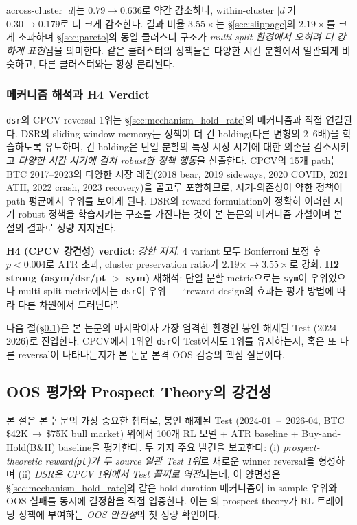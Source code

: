 \documentclass[11pt, a4paper]{article}
\begin{document}
across-cluster $|d|$는 $0.79 \to 0.636$로 약간 감소하나, within-cluster $|d|$가
$0.30 \to 0.179$로 더 크게 감소한다. 결과 비율 $3.55\times$는 \S\ref{sec:slippage}의
$2.19\times$를 크게 초과하며 \S\ref{sec:pareto}의 동일 클러스터 구조가
\emph{multi-split 환경에서 오히려 더 강하게 표현}됨을 의미한다. 같은 클러스터의
정책들은 다양한 시간 분할에서 일관되게 비슷하고, 다른 클러스터와는 항상 분리된다.

\subsubsection{메커니즘 해석과 H4 Verdict}
\label{sec:cpcv_mechanism}

\texttt{dsr}의 CPCV reversal 1위는 \S\ref{sec:mechanism_hold_rate}의 메커니즘과
직접 연결된다. DSR의 sliding-window memory는 정책이 더 긴 holding(다른 변형의
2--6배)을 학습하도록 유도하며, 긴 holding은 단일 분할의 특정 시장 시기에 대한
의존을 감소시키고 \emph{다양한 시간 시기에 걸쳐 robust한 정책 행동}을
산출한다. CPCV의 15개 path는 BTC 2017--2023의 다양한 시장 레짐(2018 bear,
2019 sideways, 2020 COVID, 2021 ATH, 2022 crash, 2023 recovery)을 골고루
포함하므로, 시기-의존성이 약한 정책이 path 평균에서 우위를 보이게 된다.
DSR의 reward formulation이 정확히 이러한 시기-robust 정책을 학습시키는 구조를
가진다는 것이 본 논문의 메커니즘 가설이며 본 절의 결과로 정량 지지된다.

\textbf{H4 (CPCV 강건성) verdict}: \emph{강한 지지}. 4 variant 모두 Bonferroni
보정 후 $p < 0.004$로 ATR 초과, cluster preservation ratio가 $2.19\times \to
3.55\times$로 강화. \textbf{H2 strong (asym/dsr/pt $>$ sym)} 재해석: 단일 분할
metric으로는 \texttt{sym}이 우위였으나 multi-split metric에서는 \texttt{dsr}이
우위 --- ``reward design의 효과는 평가 방법에 따라 다른 차원에서 드러난다''.

다음 절(\S\ref{sec:oos})은 본 논문의 마지막이자 가장 엄격한 환경인 봉인 해제된
Test (2024--2026)로 진입한다. CPCV에서 1위인 \texttt{dsr}이 Test에서도 1위를
유지하는지, 혹은 또 다른 reversal이 나타나는지가 본 논문 본격 OOS 검증의 핵심
질문이다.

\subsection{OOS 평가와 Prospect Theory의 강건성}
\label{sec:oos}

본 절은 본 논문의 가장 중요한 챕터로, 봉인 해제된 Test (2024-01 \,--\, 2026-04,
BTC \$42K\,$\to$\,\$75K bull market) 위에서 100개 RL 모델 + ATR baseline +
Buy-and-Hold(B\&H) baseline을 평가한다. 두 가지 주요 발견을 보고한다:
(i) \emph{prospect-theoretic reward(\texttt{pt})가 두 source 일관 Test 1위}로
새로운 winner reversal을 형성하며 (ii) \emph{DSR은 CPCV 1위에서 Test 꼴찌로
역전}되는데, 이 양면성은 \S\ref{sec:mechanism_hold_rate}의 같은 hold-duration
메커니즘이 in-sample 우위와 OOS 실패를 동시에 결정함을 직접 입증한다. 이는
\citet{kahneman1979prospect}의 prospect theory가 RL 트레이딩 정책에 부여하는
\emph{OOS 안전성}의 첫 정량 확인이다.
\end{document}
